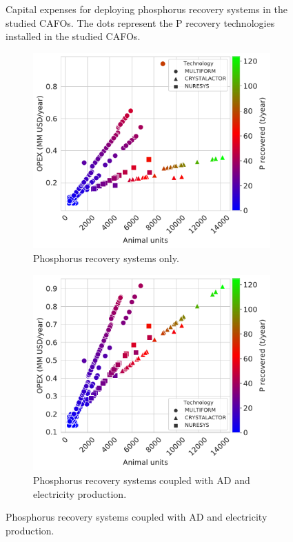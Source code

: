\begin{refsection}[referencesCh4]
\begin{figure}[h!]
	\caption{Capital expenses for deploying phosphorus recovery systems in the studied CAFOs. The dots represent the P recovery technologies installed in the studied CAFOs.}
	\label{fig:Capital_TechSelected}
\end{figure}


\begin{figure}[h!]
	\centering
	\begin{subfigure}[t]{0.7\linewidth}
		\centering
		\includegraphics[width=\linewidth]{gfx/Chapter4/Amortized_TechSelected_Pcredits22_REC0.pdf} 
		\caption{Phosphorus recovery systems only.}
		\label{fig:OPEX_TechSelected_Pcredits22_REC0}
	\end{subfigure}
	
	\begin{subfigure}[t]{0.7\linewidth}
		\centering
		\includegraphics[width=\linewidth]{gfx/Chapter4/Amortized_TechSelected_Pcredits22_REC60.pdf}
		\caption{Phosphorus recovery systems coupled with AD and electricity production.}
		\label{fig:OPEX_TechSelected_Pcredits22_REC60}
	\end{subfigure}
	

\end{figure}
\end{refsection}
